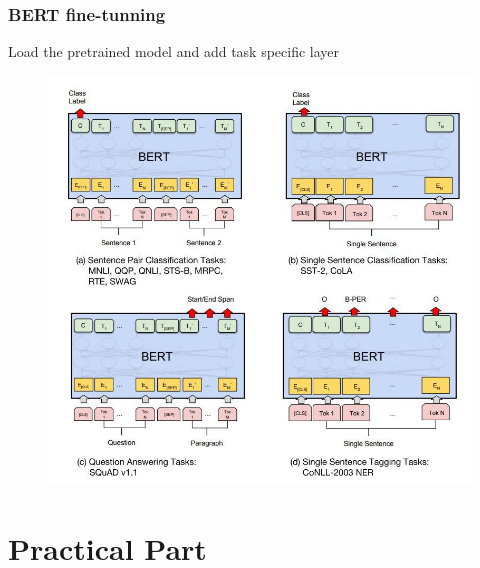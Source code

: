 \documentclass{beamer}
\begin{document}
\begin{frame}
    \frametitle{BERT fine-tunning}
    Load the pretrained model and add task specific layer
    \begin{figure}
    \includegraphics[scale=0.24]{images/fine-tunning.jpeg}
    \end{figure}
\end{frame}


\section{Practical Part}
\end{document}
